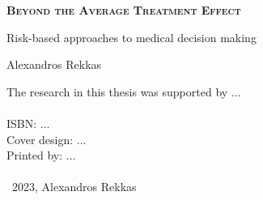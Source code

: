 \pagestyle{empty}

\def\drop{.1\textheight}

\vspace*{6cm}
\begin{center}
\Large \textbf{\textsc{Beyond the Average Treatment Effect}}\par
\Large Risk-based approaches to medical decision making \par

\vspace*{1.8cm}

\Large Alexandros Rekkas

\end{center}

\clearpage

\thispagestyle{empty}
\vspace*{13cm}

\begingroup %
\small
\setlength{\parskip}{\baselineskip} %
\setlength\parindent{0pt} %
The research in this thesis was supported by ...\\
\\
ISBN: ... \\
Cover design: ...\\
Printed by: ...\\
\\
\textcopyright\ 2023, Alexandros Rekkas

\endgroup

\newpage
\thispagestyle{empty}

